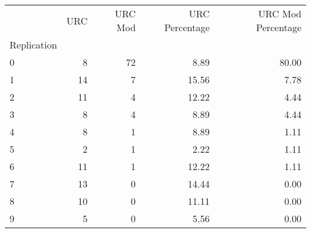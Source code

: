 \begin{tabular}{lrrrr}
\toprule
 & URC & URC Mod & URC Percentage & URC Mod Percentage \\
Replication &  &  &  &  \\
\midrule
0 & 8 & 72 & 8.89 & 80.00 \\
1 & 14 & 7 & 15.56 & 7.78 \\
2 & 11 & 4 & 12.22 & 4.44 \\
3 & 8 & 4 & 8.89 & 4.44 \\
4 & 8 & 1 & 8.89 & 1.11 \\
5 & 2 & 1 & 2.22 & 1.11 \\
6 & 11 & 1 & 12.22 & 1.11 \\
7 & 13 & 0 & 14.44 & 0.00 \\
8 & 10 & 0 & 11.11 & 0.00 \\
9 & 5 & 0 & 5.56 & 0.00 \\
\bottomrule
\end{tabular}
